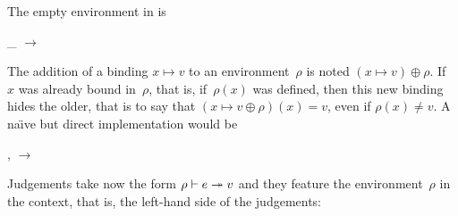 The empty environment in \OCaml is
\begin{center}
\Xlet {} \equal \Xfun \_ $\rightarrow$
 
\end{center}
The addition of a binding $x \mapsto v$ to an environment~$\rho$ is
noted $(x \mapsto v) \oplus \rho$. If~$x$ was already bound in~$\rho$,
that is, if~$\rho (x)$ was defined, then this new binding hides the
older, that is to say that $(x \mapsto v \oplus \rho) (x) = v$, even
if $\rho (x) \neq v$. A na\"{\i}ve but direct implementation would be
\begin{center}
\Xlet {} \lpar{},\rpar{} 
\equal \Xfun {} $\rightarrow$ \Xif {} \equal {}
\Xthen {} \Xelse {} 
\end{center}
Judgements take now the form ${\rho} \vdash {e} \twoheadrightarrow {v}$ and they feature the
environment~$\rho$ in the context, that is, the left\hyp{}hand side of
the judgements:

